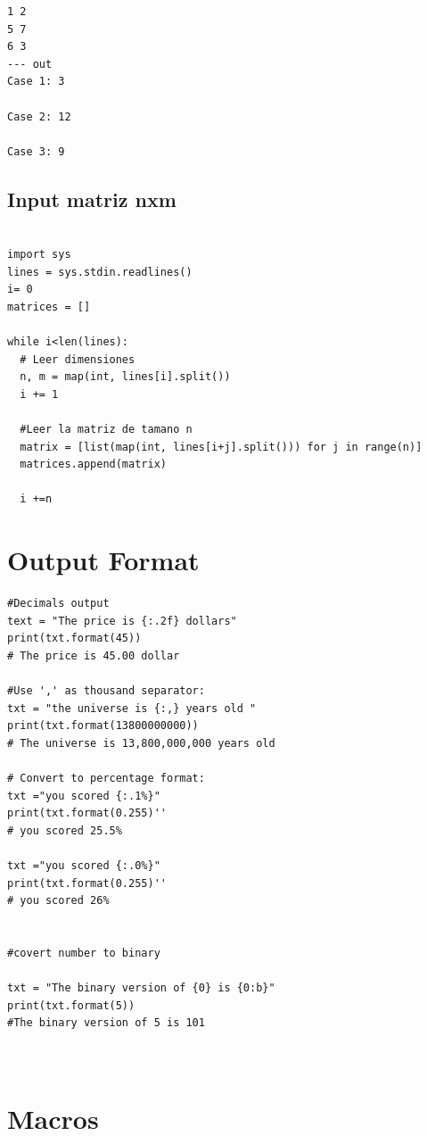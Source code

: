 \documentclass{article}
\begin{document}
\begin{lstlisting}
1 2
5 7
6 3
--- out
Case 1: 3

Case 2: 12

Case 3: 9

\end{lstlisting}

\subsection{Input matriz nxm}

\begin{lstlisting}[style=pythonstyle]

import sys
lines = sys.stdin.readlines()
i= 0
matrices = []

while i<len(lines):
  # Leer dimensiones
  n, m = map(int, lines[i].split())
  i += 1

  #Leer la matriz de tamano n
  matrix = [list(map(int, lines[i+j].split())) for j in range(n)]
  matrices.append(matrix)

  i +=n

\end{lstlisting}




\section{Output Format}

\begin{lstlisting}[style=pythonstyle]
#Decimals output
text = "The price is {:.2f} dollars"
print(txt.format(45))
# The price is 45.00 dollar

#Use ',' as thousand separator:
txt = "the universe is {:,} years old "
print(txt.format(13800000000))
# The universe is 13,800,000,000 years old

# Convert to percentage format:
txt ="you scored {:.1%}"
print(txt.format(0.255)''
# you scored 25.5%

txt ="you scored {:.0%}"
print(txt.format(0.255)''
# you scored 26%


#covert number to binary

txt = "The binary version of {0} is {0:b}"
print(txt.format(5))
#The binary version of 5 is 101



\end{lstlisting}


\section{Macros}
\end{document}
